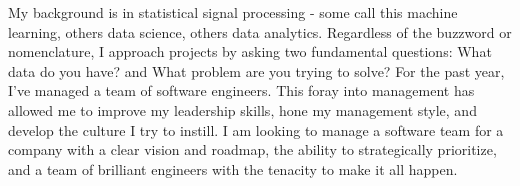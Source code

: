 

\begin{cvparagraph}

  My background is in statistical signal processing - some call this machine learning,
  others data science, others data analytics. Regardless of the buzzword or nomenclature,
  I approach projects by asking two fundamental questions: What data do you have? and What
  problem are you trying to solve? For the past year, I've managed a team of software
  engineers. This foray into management has allowed me to improve my leadership skills,
  hone my management style, and develop the culture I try to instill. I am looking to
  manage a software team for a company with a clear vision and roadmap, the ability to
  strategically prioritize, and a team of brilliant engineers with the tenacity to make it
  all happen.
\end{cvparagraph}



